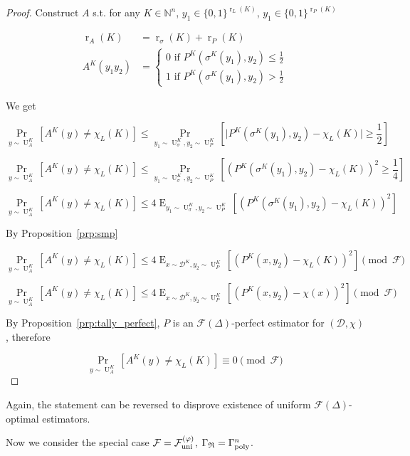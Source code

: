 \documentclass{article}
\numberwithin{equation}{section}
\theoremstyle{definition}
\theoremstyle{plain}
\newcommand{\Bool}{\{0,1\}}
\DeclareMathOperator{\Prb}{Pr}
\DeclareMathOperator{\E}{E}
\DeclareMathOperator{\R}{r}
\DeclareMathOperator{\Un}{U}
\newcommand{\Nats}{\mathbb{N}}
\newcommand{\Abs}[1]{\lvert #1 \rvert}
\newcommand{\Dist}{\mathcal{D}}
\newcommand{\GrowR}{\Gamma_{\mathfrak{R}}}
\newcommand{\Fall}{\mathcal{F}}
\newcommand{\BoolR}[1]{\Bool^{\R_{#1}(K)}}
\newcommand{\GammaPoly}{\Gamma_{\textnormal{poly}}}
\newcommand{\FallUt}[1]{{\Fall_{\textnormal{uni}}^{(#1)}}}
\begin{document}
\begin{proof}

Construct ${A}$ s.t. for any ${K \in \Nats^n}$, ${y_1 \in \BoolR{L}}$, ${y_1 \in \BoolR{P}}$

\begin{align*}
\R_A(K) &= \R_\sigma(K)+\R_P(K) \\
A^K(y_1 y_2) &= \begin{cases}0 \text{ if } P^K(\sigma^K(y_1),y_2) \leq \frac{1}{2} \\ 1 \text{ if } P^K(\sigma^K(y_1),y_2) > \frac{1}{2} \end{cases}
\end{align*}

We get

\[\Prb_{y \sim \Un_A^K}[A^K(y) \neq \chi_L(K)] \leq \Prb_{y_1 \sim \Un_\sigma^K,y_2 \sim \Un_P^K}[\Abs{P^K(\sigma^K(y_1),y_2) - \chi_L(K)} \geq \frac{1}{2}]\]

\[\Prb_{y \sim \Un_A^K}[A^K(y) \neq \chi_L(K)] \leq \Prb_{y_1 \sim \Un_\sigma^K,y_2 \sim \Un_P^K}[(P^K(\sigma^K(y_1),y_2) - \chi_L(K))^2 \geq \frac{1}{4}]\]

\[\Prb_{y \sim \Un_A^K}[A^K(y) \neq \chi_L(K)] \leq 4 \E_{y_1 \sim \Un_\sigma^K,y_2 \sim \Un_P^K}[(P^K(\sigma^K(y_1),y_2) - \chi_L(K))^2]\]

By Proposition~\ref{prp:smp}

\[\Prb_{y \sim \Un_A^K}[A^K(y) \neq \chi_L(K)] \leq 4 \E_{x \sim \Dist^K,y_2 \sim \Un_P^K}[(P^K(x,y_2) - \chi_L(K))^2] \pmod \Fall\]

\[\Prb_{y \sim \Un_A^K}[A^K(y) \neq \chi_L(K)] \leq 4 \E_{x \sim \Dist^K,y_2 \sim \Un_P^K}[(P^K(x,y_2) - \chi(x))^2] \pmod \Fall\]

By Proposition~\ref{prp:tally_perfect}, ${P}$ is an ${\Fall(\Delta)}$-perfect estimator for ${(\Dist,\chi)}$, therefore

\[\Prb_{y \sim \Un_A^K}[A^K(y) \neq \chi_L(K)] \equiv 0 \pmod \Fall\]
%
\end{proof}

Again, the statement can be reversed to disprove existence of uniform ${\Fall(\Delta)}$-optimal estimators.

Now we consider the special case ${\Fall=\FallUt{\varphi}}$, ${\GrowR = \GammaPoly^n}$. 
\end{document}
